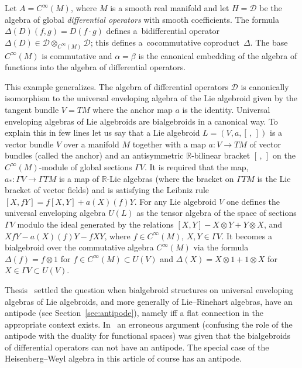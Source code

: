 \documentclass[10pt,a4paper]{amsart}
\numberwithin{equation}{section}
\begin{document}
\begin{Example}\label{ex:basic} Let $A = C^\infty(M)$, where $M$ is a smooth real manifold and let $H=\mathcal{D}$ be the algebra of global {\it differential operators} with smooth coefficients. The formula $\Delta(D)(f,g) = D(f\cdot g)$ defines a~bidifferential operator $\Delta(D)\in\mathcal{D}\otimes_{C^\infty(M)}\mathcal{D}$; this defines a~cocommutative coproduct~$\Delta$. The base $C^\infty(M)$ is commutative and $\alpha = \beta$ is the canonical embedding of the algebra of functions into the algebra of differential operators.

This example generalizes. The algebra of differential operators $\mathcal{D}$ is canonically isomorphism to the universal enveloping algebra of the Lie algebroid given by the tangent bundle $V = T M$ where the anchor map $a$ is the identity. Universal enveloping algebras of Lie algebroids are bialgebroids in a canonical way. To explain this in few lines let us say that a Lie algebroid $L = (V,a,[\,,\,])$ is a vector bundle $V$ over a manifold $M$ together with a map $a\colon V\to T M$ of vector bundles (called the anchor) and an antisymmetric $\mathbb{R}$-bilinear bracket $[\,,\,]$ on the $C^\infty(M)$-module of global sections $\Gamma V$. It is required that the map, $a_*\colon \Gamma V\to\Gamma T M$ is a map of $\mathbb{R}$-Lie algebras (where the bracket on $\Gamma T M$ is the Lie bracket of vector fields) and is satisfying the Leibniz rule $[X,f Y] = f [X,Y] + a(X)(f)Y$.
For any Lie algebroid $V$ one defines the universal enveloping algebra $U(L)$ as the tensor algebra of the space of sections $\Gamma V$ modulo the ideal generated by the relations $[X,Y] - X\otimes Y + Y\otimes X$, and $X f Y - a(X)(f)Y - f X Y$, where $f\in C^\infty(M)$, $X,Y\in\Gamma V$. It becomes a bialgebroid over the commutative algebra $C^\infty(M)$ via the formula $\Delta(f) = f\otimes 1$ for $f\in C^\infty(M)\subset U(V)$ and $\Delta(X) = X\otimes 1 + 1\otimes X$ for $X\in\Gamma V\subset U(V)$.

Thesis~\cite{kowalzig} settled the question when bialgebroid structures on universal enveloping algebras of Lie algebroids, and more generally of Lie--Rinehart algebras, have an antipode (see Section~\ref{sec:antipode}), namely iff a flat connection in the appropriate context exists. In~\cite{xu} an erroneous argument (confusing the role of the antipode with the duality for functional spaces) was given that the bialgebroids of differential operators can not have an antipode. The special case of the Heisenberg--Weyl algebra in this article of course has an antipode.
\end{Example}
\end{document}
